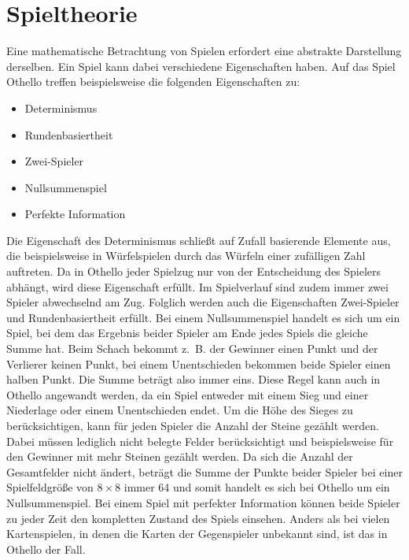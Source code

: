 \section{Spieltheorie}
\label{sec:spieltheorie}

Eine mathematische Betrachtung von Spielen erfordert eine abstrakte Darstellung derselben. Ein Spiel kann dabei
verschiedene Eigenschaften haben. Auf das Spiel Othello treffen beispielsweise die folgenden Eigenschaften zu:

\begin{itemize}
    \item Determinismus
    \item Rundenbasiertheit
    \item Zwei-Spieler
    \item Nullsummenspiel
    \item Perfekte Information
\end{itemize}

Die Eigenschaft des Determinismus schließt auf Zufall basierende Elemente aus, die beispielsweise in Würfelspielen durch
das Würfeln einer zufälligen Zahl auftreten. Da in Othello jeder Spielzug nur von der Entscheidung des Spielers abhängt,
wird diese Eigenschaft erfüllt. Im Spielverlauf sind zudem immer zwei Spieler abwechselnd am Zug. Folglich werden auch
die Eigenschaften Zwei-Spieler und Rundenbasiertheit erfüllt. Bei einem Nullsummenspiel handelt es sich um ein
Spiel, bei dem das Ergebnis beider Spieler am Ende jedes Spiels die gleiche Summe hat. Beim Schach bekommt z. B. der
Gewinner einen Punkt und der Verlierer keinen Punkt, bei einem Unentschieden bekommen beide Spieler einen halben Punkt.
Die Summe beträgt also immer eins. Diese Regel kann auch in Othello angewandt werden, da ein Spiel entweder mit einem
Sieg und einer Niederlage oder einem Unentschieden endet. Um die Höhe des Sieges zu berücksichtigen, kann für jeden
Spieler die Anzahl der Steine gezählt werden. Dabei müssen lediglich nicht belegte Felder berücksichtigt und
beispielsweise für den Gewinner mit mehr Steinen gezählt werden. Da sich die Anzahl der Gesamtfelder nicht ändert,
beträgt die Summe der Punkte beider Spieler bei einer Spielfeldgröße von $8\times 8$ immer 64 und somit handelt es sich
bei Othello um ein Nullsummenspiel. Bei einem Spiel mit perfekter Information können beide Spieler zu jeder Zeit den
kompletten Zustand des Spiels einsehen. Anders als bei vielen Kartenspielen, in denen die Karten der
Gegenspieler unbekannt sind, ist das in Othello der Fall.
\cite[S.~161f.]{ai2010russel}

